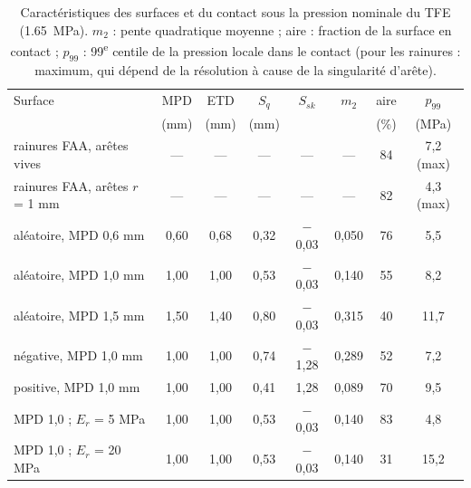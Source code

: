 \begin{table}[H]\centering\small
\caption{Caractéristiques des surfaces et du contact sous la pression nominale du TFE (\SI{1.65}{MPa}).
$m_2$ : pente quadratique moyenne ; aire : fraction de la surface en contact ; $p_{99}$ : 99\textsuperscript{e}
centile de la pression locale dans le contact (pour les rainures : maximum, qui dépend de la
résolution à cause de la singularité d'arête).}\label{tab:surfaces}
\begin{tabular}{lccccccc}
\toprule
Surface & MPD & ETD & $S_q$ & $S_{sk}$ & $m_2$ & aire & $p_{99}$\\
 & (mm) & (mm) & (mm) & & & (\%) & (MPa)\\
\midrule
rainures FAA, arêtes vives & --- & --- & --- & --- & --- & 84 & 7,2 (max)\\
rainures FAA, arêtes $r$ = 1 mm & --- & --- & --- & --- & --- & 82 & 4,3 (max)\\
aléatoire, MPD 0,6 mm & 0,60 & 0,68 & 0,32 & $-$0,03 & 0,050 & 76 & 5,5\\
aléatoire, MPD 1,0 mm & 1,00 & 1,00 & 0,53 & $-$0,03 & 0,140 & 55 & 8,2\\
aléatoire, MPD 1,5 mm & 1,50 & 1,40 & 0,80 & $-$0,03 & 0,315 & 40 & 11,7\\
négative, MPD 1,0 mm & 1,00 & 1,00 & 0,74 & $-$1,28 & 0,289 & 52 & 7,2\\
positive, MPD 1,0 mm & 1,00 & 1,00 & 0,41 & 1,28 & 0,089 & 70 & 9,5\\
MPD 1,0 ; $E_r$ = 5 MPa & 1,00 & 1,00 & 0,53 & $-$0,03 & 0,140 & 83 & 4,8\\
MPD 1,0 ; $E_r$ = 20 MPa & 1,00 & 1,00 & 0,53 & $-$0,03 & 0,140 & 31 & 15,2\\
\bottomrule
\end{tabular}
\end{table}

